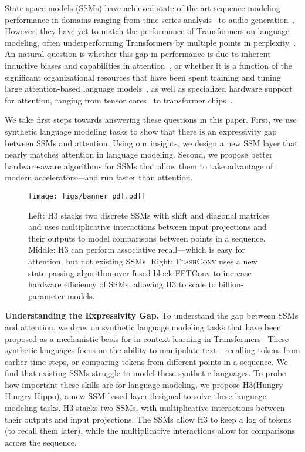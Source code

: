 \documentclass{article}
\newcommand{\fastfft}{\textsc{FlashConv}\xspace}
\newcommand{\hthree}{\textsc{H3}\xspace}
\begin{document}
State space models (SSMs) have achieved state-of-the-art sequence modeling performance in domains ranging from time series analysis~\citep{gu2022efficiently} to audio generation~\citep{goel2022s}.
However, they have yet to match the performance of Transformers on language modeling, often underperforming Transformers by multiple points in perplexity~\citep{gu2022efficiently}.
An natural question is whether this gap in performance is due to inherent inductive biases and capabilities in attention~\citep{edelman2022inductive,olsson2022context}, or whether it is a function of the significant organizational resources that have been spent training and tuning large attention-based language models~\citep{chowdhery2022palm,hoffmann2022training,zhang2022opt}, as well as specialized hardware support for attention, ranging from tensor cores~\citep{nvidia2017nvidia} to transformer chips~\citep{nvidia2022nvidia,kao2021optimized}.

We take first steps towards answering these questions in this paper.
First, we use synthetic language modeling tasks to show that there is an expressivity gap between SSMs and attention.
Using our insights, we design a new SSM layer that nearly matches attention in language modeling.
Second, we propose better hardware-aware algorithms for SSMs that allow them to take advantage of modern accelerators---and run faster than attention.

\begin{figure}
    \centering
    \texttt{[image: figs/banner\_pdf.pdf]}
    \caption{\label{fig:banner}
    Left: \hthree stacks two discrete SSMs with shift and diagonal matrices and uses multiplicative interactions between input projections and their outputs to model comparisons between points in a sequence.
    Middle: \hthree can perform associative recall---which is easy for attention, but not existing SSMs.
    Right: \fastfft uses a new state-passing algorithm over fused block FFTConv to increase hardware efficiency of SSMs, allowing \hthree to scale to billion-parameter models.
    }
    \vspace{-1.25em}
\end{figure} 
\textbf{Understanding the Expressivity Gap.}
To understand the gap between SSMs and attention, we draw on synthetic language modeling tasks that have been proposed as a mechanistic basis for in-context learning in Transformers~\citep{olsson2022context}
These synthetic languages focus on the ability to manipulate text---recalling tokens from earlier time steps, or comparing tokens from different points in a sequence.
We find that existing SSMs struggle to model these synthetic languages.
To probe how important these skills are for language modeling, we propose \hthree (Hungry Hungry Hippo), a new SSM-based layer designed to solve these language modeling tasks.
\hthree stacks two SSMs, with multiplicative interactions between their outputs and input projections.
The SSMs allow \hthree to keep a log of tokens (to recall them later), while the multiplicative interactions allow for comparisons across the sequence.
\end{document}
